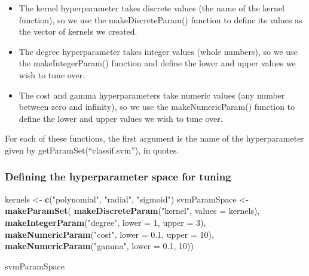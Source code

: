 \documentclass[
]{article}
\newenvironment{Shaded}{\begin{snugshade}}{\end{snugshade}}
\newcommand{\AttributeTok}[1]{\textcolor[rgb]{0.13,0.29,0.53}{#1}}
\newcommand{\DecValTok}[1]{\textcolor[rgb]{0.00,0.00,0.81}{#1}}
\newcommand{\FloatTok}[1]{\textcolor[rgb]{0.00,0.00,0.81}{#1}}
\newcommand{\FunctionTok}[1]{\textcolor[rgb]{0.13,0.29,0.53}{\textbf{#1}}}
\newcommand{\NormalTok}[1]{#1}
\newcommand{\OtherTok}[1]{\textcolor[rgb]{0.56,0.35,0.01}{#1}}
\newcommand{\StringTok}[1]{\textcolor[rgb]{0.31,0.60,0.02}{#1}}
\begin{document}
\begin{itemize}
\item
  The kernel hyperparameter takes discrete values (the name of the
  kernel function), so we use the makeDiscreteParam() function to define
  its values as the vector of kernels we created.
\item
  The degree hyperparameter takes integer values (whole numbers), so we
  use the makeIntegerParam() function and define the lower and upper
  values we wish to tune over.
\item
  The cost and gamma hyperparameters take numeric values (any number
  between zero and infinity), so we use the makeNumericParam() function
  to define the lower and upper values we wish to tune over.
\end{itemize}

For each of these functions, the first argument is the name of the
hyperparameter given by getParamSet(``classif.svm''), in quotes.

\subsubsection{Defining the hyperparameter space for
tuning}\label{defining-the-hyperparameter-space-for-tuning}

\begin{Shaded}
\begin{Highlighting}[]
\NormalTok{kernels }\OtherTok{\textless{}{-}} \FunctionTok{c}\NormalTok{(}\StringTok{"polynomial"}\NormalTok{, }\StringTok{"radial"}\NormalTok{, }\StringTok{"sigmoid"}\NormalTok{)}
\NormalTok{svmParamSpace }\OtherTok{\textless{}{-}} \FunctionTok{makeParamSet}\NormalTok{(}
  \FunctionTok{makeDiscreteParam}\NormalTok{(}\StringTok{"kernel"}\NormalTok{, }\AttributeTok{values =}\NormalTok{ kernels),}
  \FunctionTok{makeIntegerParam}\NormalTok{(}\StringTok{"degree"}\NormalTok{, }\AttributeTok{lower =} \DecValTok{1}\NormalTok{, }\AttributeTok{upper =} \DecValTok{3}\NormalTok{),}
  \FunctionTok{makeNumericParam}\NormalTok{(}\StringTok{"cost"}\NormalTok{, }\AttributeTok{lower =} \FloatTok{0.1}\NormalTok{, }\AttributeTok{upper =} \DecValTok{10}\NormalTok{),}
  \FunctionTok{makeNumericParam}\NormalTok{(}\StringTok{"gamma"}\NormalTok{, }\AttributeTok{lower =} \FloatTok{0.1}\NormalTok{, }\DecValTok{10}\NormalTok{))}
\end{Highlighting}
\end{Shaded}

\begin{Shaded}
\begin{Highlighting}[]
\NormalTok{svmParamSpace}
\end{Highlighting}
\end{Shaded}
\end{document}

